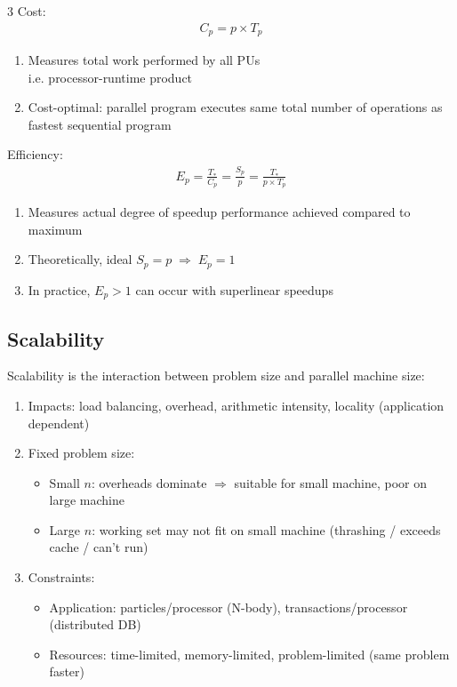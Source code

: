 \documentclass[12pt, a4paper]{article}
\begin{document}
\begin{multicols*}{3}
Cost:
\begin{gather*}
  C_p = p \times T_p
\end{gather*}
\begin{enumerate}[\roman*.]
  \item Measures total work performed by all PUs\\ 
    i.e. processor-runtime product
\item Cost-optimal: parallel program executes same total number of operations as fastest sequential program
\end{enumerate}\vspace{1em}

Efficiency:
\begin{gather*}
  E_p = \frac{T_{*}}{C_p} = \frac{S_p}{p} = \frac{T_{*}}{p \times T_p}
\end{gather*}
\begin{enumerate}[\roman*.]
  \item Measures actual degree of speedup performance achieved compared to maximum
  \item Theoretically, ideal $S_p=p \;\Rightarrow\; E_p=1$
  \item In practice, $E_p > 1$ can occur with superlinear speedups
\end{enumerate}\vspace{1em}

\colbreak
\subsection{Scalability}
Scalability is the interaction between problem size and parallel machine size:
\begin{enumerate}[\roman*.]
  \item Impacts: load balancing, overhead, arithmetic intensity, locality (application dependent)
  \item Fixed problem size:
    \begin{itemize}[leftmargin=*]\vspace{3pt}
      \item Small $n$: overheads dominate $\Rightarrow$ suitable for small machine, poor on large machine
      \item Large $n$: working set may not fit on small machine (thrashing / exceeds cache / can't run)
    \end{itemize}
  \item Constraints:
    \begin{itemize}[leftmargin=*]
      \item Application: particles/processor (N-body), transactions/processor (distributed DB) 
      \item Resources: time-limited, memory-limited, problem-limited (same problem faster)
    \end{itemize}
\end{enumerate}


\end{multicols*}
\end{document}

